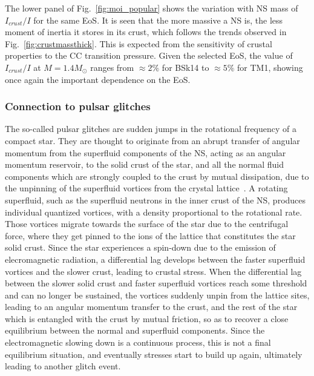 The lower panel of Fig.~\ref{fig:moi_popular} shows the variation with NS mass
of $I_{crust}/I$ for the same EoS. It is seen that the more massive a 
NS is, the less moment of inertia it stores in its crust, which follows
the trends observed in Fig.~\ref{fig:crustmassthick}. This is expected from 
the sensitivity of crustal properties to the CC transition pressure. Given the 
selected EoS, the value of $I_{crust}/I$ at $M=1.4M_\odot$ 
ranges from $\approx 2\%$ for BSk14 to $\approx 5\%$ for TM1, showing once 
again the important dependence on the EoS. 

\subsubsection{Connection to pulsar glitches}\label{subsubsec:glitch}

The so-called pulsar glitches are sudden jumps in the rotational frequency of 
a compact star. They are thought to originate from an abrupt transfer of 
angular momentum from the superfluid components of the NS, acting as an angular 
momentum reservoir, to the solid crust of the star, and all the normal fluid
components which are strongly coupled to the crust by mutual dissipation, due 
to the unpinning of the superfluid vortices from the crystal 
lattice~\cite{Anderson1975}. 
%
A rotating superfluid, such as the superfluid neutrons in the inner crust of 
the NS, produces individual quantized vortices, with a density proportional to 
the rotational rate. Those vortices migrate towards the surface of the star due 
to the centrifugal force, where they get pinned to the ions of the lattice that 
constitutes the star solid crust. Since the star experiences a spin-down due to 
the emission of elecromagnetic radiation, a differential lag develops between 
the faster superfluid vortices and the slower crust, leading to crustal stress. 
%
When the differential lag between the slower solid crust and faster superfluid 
vortices reach some threshold and can no longer be sustained, the vortices
suddenly unpin from the lattice sites, leading to an angular momentum transfer
to the crust, and the rest of the star which is entangled with the crust by
mutual friction, so as to recover a close equilibrium between the normal and
superfluid components. Since the electromagnetic slowing down is a continuous
process, this is not a final equilibrium situation, and eventually stresses 
start to build up again, ultimately leading to another glitch event.

